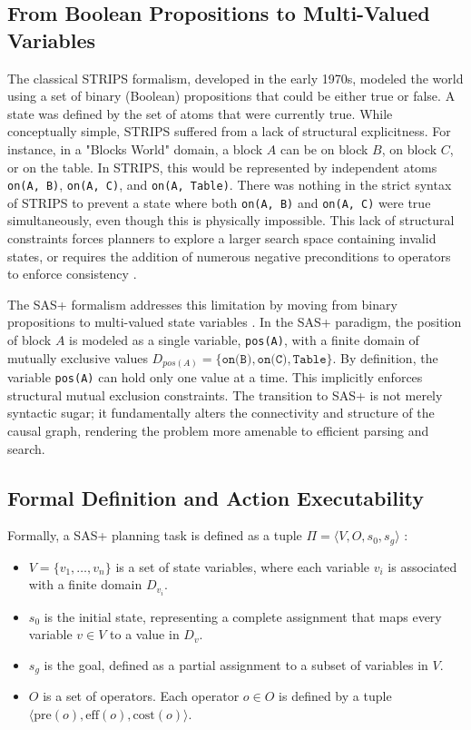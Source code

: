 \subsection{From Boolean Propositions to Multi-Valued Variables}
The classical STRIPS formalism, developed in the early 1970s, modeled the world using a set of binary (Boolean) propositions that could be either true or false. A state was defined by the set of atoms that were currently true. While conceptually simple, STRIPS suffered from a lack of structural explicitness. For instance, in a "Blocks World" domain, a block $A$ can be on block $B$, on block $C$, or on the table. In STRIPS, this would be represented by independent atoms \texttt{on(A, B)}, \texttt{on(A, C)}, and \texttt{on(A, Table)}. There was nothing in the strict syntax of STRIPS to prevent a state where both \texttt{on(A, B)} and \texttt{on(A, C)} were true simultaneously, even though this is physically impossible. This lack of structural constraints forces planners to explore a larger search space containing invalid states, or requires the addition of numerous negative preconditions to operators to enforce consistency \cite{saarland}.

The SAS+ formalism addresses this limitation by moving from binary propositions to multi-valued state variables \cite{backstrom93}. In the SAS+ paradigm, the position of block $A$ is modeled as a single variable, \texttt{pos(A)}, with a finite domain of mutually exclusive values $D_{pos(A)} = \{\texttt{on(B)}, \texttt{on(C)}, \texttt{Table}\}$. By definition, the variable \texttt{pos(A)} can hold only one value at a time. This implicitly enforces structural mutual exclusion constraints. The transition to SAS+ is not merely syntactic sugar; it fundamentally alters the connectivity and structure of the causal graph, rendering the problem more amenable to efficient parsing and search.

\subsection{Formal Definition and Action Executability}
Formally, a SAS+ planning task is defined as a tuple $\Pi = \langle V, O, s_0, s_g \rangle$ \cite{saarland, fastdownward}:
\begin{itemize}
    \item $V = \{v_1, \dots, v_n\}$ is a set of state variables, where each variable $v_i$ is associated with a finite domain $D_{v_i}$.
    \item $s_0$ is the initial state, representing a complete assignment that maps every variable $v \in V$ to a value in $D_v$.
    \item $s_g$ is the goal, defined as a partial assignment to a subset of variables in $V$.
    \item $O$ is a set of operators. Each operator $o \in O$ is defined by a tuple $\langle \text{pre}(o), \text{eff}(o), \text{cost}(o) \rangle$.
\end{itemize}

